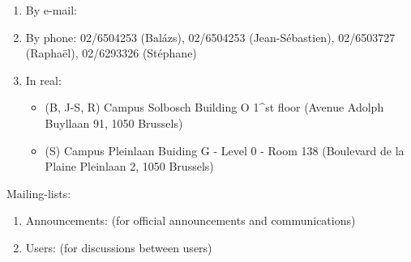 \begin{enumerate}
\item  By e-mail:  \hpcinfo
\item  By phone: 02/6504253 (Bal\'azs), 02/6504253 (Jean-S\'ebastien), 02/6503727 (Rapha\"el), 02/6293326 (St\'ephane)
\item  In real:
\begin{itemize}
\item  (B, J-S, R) Campus Solbosch Building O 1^{st} floor (Avenue Adolph Buyllaan 91, 1050 Brussels)
\item  (S) Campus Pleinlaan Buiding G - Level 0 - Room 138 (Boulevard de la Plaine Pleinlaan 2, 1050 Brussels)
\end{itemize}
\end{enumerate}

Mailing-lists:

\begin{enumerate}
\item  Announcements: \hpcannounceml (for official announcements and communications)
\item  Users: \hpcusersml (for discussions between users)
\end{enumerate}

